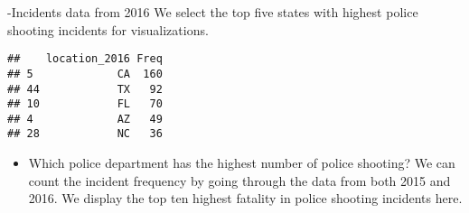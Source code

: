 \documentclass[
]{article}
\newenvironment{Shaded}{\begin{snugshade}}{\end{snugshade}}
\newcommand{\DecValTok}[1]{\textcolor[rgb]{0.00,0.00,0.81}{#1}}
\newcommand{\KeywordTok}[1]{\textcolor[rgb]{0.13,0.29,0.53}{\textbf{#1}}}
\newcommand{\NormalTok}[1]{#1}
\newcommand{\OperatorTok}[1]{\textcolor[rgb]{0.81,0.36,0.00}{\textbf{#1}}}
\newcommand{\StringTok}[1]{\textcolor[rgb]{0.31,0.60,0.02}{#1}}
\providecommand{\tightlist}{%
  \setlength{\itemsep}{0pt}\setlength{\parskip}{0pt}}
\begin{document}
-Incidents data from 2016 We select the top five states with highest
police shooting incidents for visualizations.

\begin{Shaded}
\end{Shaded}

\begin{verbatim}
##    location_2016 Freq
## 5             CA  160
## 44            TX   92
## 10            FL   70
## 4             AZ   49
## 28            NC   36
\end{verbatim}

\begin{itemize}
\tightlist
\item
  Which police department has the highest number of police shooting? We
  can count the incident frequency by going through the data from both
  2015 and 2016. We display the top ten highest fatality in police
  shooting incidents here.
\end{itemize}

\begin{Shaded}
\end{Shaded}
\end{document}

